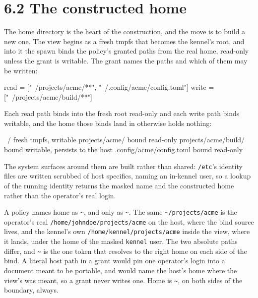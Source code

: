 \hypertarget{the-constructed-home}{%
\section{6.2 The constructed home}\label{the-constructed-home}}

The home directory is the heart of the construction, and the move is to
build a new one. The view begins as a fresh tmpfs that becomes the
kennel's root, and into it the spawn binds the policy's granted paths
from the real home, read-only unless the grant is writable. The grant
names the paths and which of them may be written:

\begin{kennelcode}
[fs]
read  = ["~/projects/acme/**", "~/.config/acme/config.toml"]
write = ["~/projects/acme/build/**"]
\end{kennelcode}

Each read path binds into the fresh root read-only and each write path
binds writable, and the home those binds land in otherwise holds
nothing:

\begin{kennelcode}
~/                              fresh tmpfs, writable
  projects/acme/                bound read-only
  projects/acme/build/          bound writable, persists to the host
  .config/acme/config.toml      bound read-only
\end{kennelcode}

The system surfaces around them are built rather than shared:
\texttt{/etc}'s identity files are written scrubbed of host specifics,
naming an in-kennel user, so a lookup of the running identity returns
the masked name and the constructed home rather than the operator's real
login.

A policy names home as \texttt{\textasciitilde{}}, and only as
\texttt{\textasciitilde{}}. The same
\texttt{\textasciitilde{}/projects/acme} is the operator's real
\texttt{/home/johndoe/projects/acme} on the host, where the bind source
lives, and the kennel's own \texttt{/home/kennel/projects/acme} inside
the view, where it lands, under the home of the masked \texttt{kennel}
user. The two absolute paths differ, and \texttt{\textasciitilde{}} is
the one token that resolves to the right home on each side of the bind.
A literal host path in a grant would pin one operator's login into a
document meant to be portable, and would name the host's home where the
view's was meant, so a grant never writes one. Home is
\texttt{\textasciitilde{}}, on both sides of the boundary, always.

